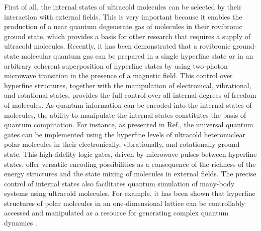 First of all, the internal states of ultracold molecules can be selected by their interaction with  
external fields. This is very important because it enables the production of a near quantum degenerate gas of 
molecules in their rovibronic ground state\cite{ni2008, danzl2010}, which provides a basis for other research that 
requires a supply of  ultracold molecules. 
Recently, it has been demonstrated that a rovibronic ground-state molecular quantum gas  can be prepared in a single 
hyperfine state or in an arbitrary coherent superposition of hyperfine states\cite{ospelkaus2010} by using two-photon
microwave transition in the presence of a magnetic field. This control over hyperfine structures, together with the 
manipulation of electronical, vibrational, and rotational states, provides the full control over all internal degrees of
freedom of molecules. As quantum information can be encoded 
into the internal states of molecules,  the ability to manipulate the internal states constitutes the basis of 
quantum computation. For instance, as presented in Ref.\cite{pellegrini2011}, the universal quantum gates can be 
implemented using the hyperfine levels of ultracold 
heteronuclear polar molecules in their electronically, vibrationally, and rotationally ground state. This high-fidelity 
logic gates, driven by microwave pulses between hyperfine states, offer versatile encoding possibilities as a 
consequence of the richness of the energy structures and the state mixing of molecules in external fields. The precise control of internal states also 
facilitates quantum simulation of many-body systems using ultracold molecules. For example, it has been shown that hyperfine structures of polar molecules in an one-dimensional 
lattice can be controllably accessed and manipulated as a resource for generating complex quantum dynamics
\cite{Carr2}.  

